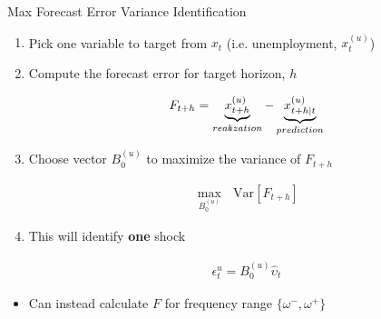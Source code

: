 \begin{frame}{Max Forecast Error Variance Identification}

  \begin{enumerate}
    \item Pick one variable to target from $x_t$ (i.e. unemployment, $x_t^{(u)}$)
    \item Compute the forecast error for target horizon, $h$
    
    \vspace{-1.1cm}
    \begin{align*}
      F_{t+h} = \underbrace{x^{(u)}_{t+h}}_{real\hspace{-0.05cm}ization} - \underbrace{x^{(u)}_{t+h \mid t}}_{prediction}
    \end{align*}
    \vspace{-0.6cm}

    \item Choose vector $B_0^{(u)}$ to maximize the variance of $F_{t+h}$
    
    \vspace{-1.1cm}
    \begin{align*}
      \max_{B_0^{(u)}} \ \ \ \text{Var}[F_{t+h}]
    \end{align*}
    \vspace{-0.75cm}

    \item This will identify \textbf{one} shock

    \vspace{-1.1cm}
    \begin{align*}
      \epsilon_t^{u} = B_0^{(u)} \hat{\upsilon}_t
    \end{align*}
    \vspace{-1.2cm} 
  \end{enumerate}
  \begin{itemize}
    \item Can instead calculate $F$ for frequency range $\{\omega^-, \omega^+\}$
  \end{itemize}
  
  \end{frame}